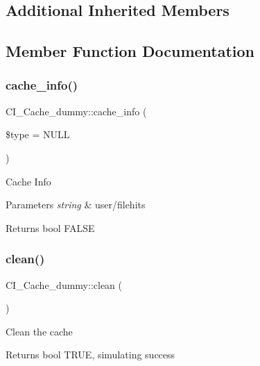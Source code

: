 \subsection*{Additional Inherited Members}


\subsection{Member Function Documentation}
\mbox{\label{class_c_i___cache__dummy_a18b7eb603cd5a9953f76f25e99691a8f}} 
\subsubsection{\texorpdfstring{cache\+\_\+info()}{cache\_info()}}
{\footnotesize\ttfamily C\+I\+\_\+\+Cache\+\_\+dummy\+::cache\+\_\+info (\begin{DoxyParamCaption}\item[{}]{\$type = {\ttfamily NULL} }\end{DoxyParamCaption})}

Cache Info


\begin{DoxyParams}{Parameters}
{\em string} & user/filehits \\
\hline
\end{DoxyParams}
\begin{DoxyReturn}{Returns}
bool F\+A\+L\+SE 
\end{DoxyReturn}
\mbox{\label{class_c_i___cache__dummy_a8a103d7c67427bdc5a29774af921cc0a}} 
\subsubsection{\texorpdfstring{clean()}{clean()}}
{\footnotesize\ttfamily C\+I\+\_\+\+Cache\+\_\+dummy\+::clean (\begin{DoxyParamCaption}{ }\end{DoxyParamCaption})}

Clean the cache

\begin{DoxyReturn}{Returns}
bool T\+R\+UE, simulating success 
\end{DoxyReturn}
\mbox{\label{class_c_i___cache__dummy_a7651c44e7e75dcfc400b0ef88e7f6bf0}} 
